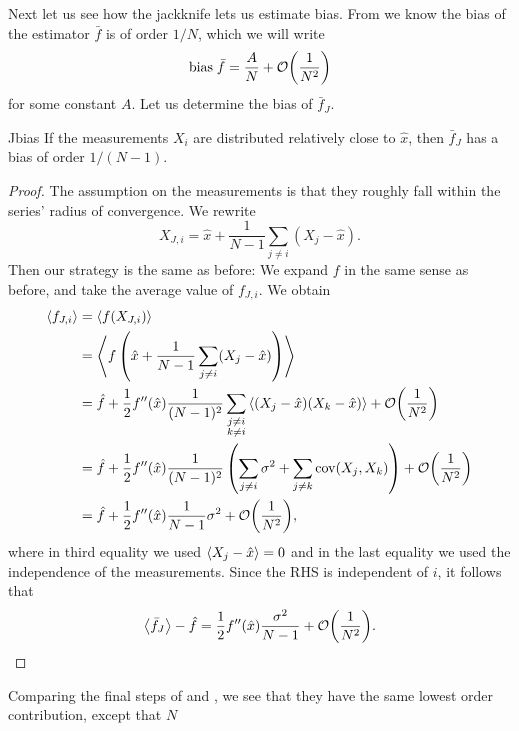 Next let us see how the jackknife lets us estimate bias.
From  we know the bias of the estimator $\bar{f}$ 
is of order $1/N$, which we will write
\begin{equation}\label{eq:bias}
  \text{bias}\;\bar{f}=\frac{A}{N}+\order{\frac{1}{N^2}}
\end{equation}
for some constant $A$. Let us determine the bias of $\bar{f}_J$.
\begin{proposition}{}{Jbias}
  If the measurements $X_i$ are distributed relatively close to $\hat{x}$, 
  then $\bar{f}_J$ has a bias of order $1/(N-1)$.
  \begin{proof}
    The assumption on the measurements is that they roughly fall within
    the series' radius of convergence. We rewrite
    $$
      X_{J,i}=\hat{x}+\frac{1}{N-1}\sum_{j\neq i}(X_j-\hat{x}).
    $$
    Then our strategy is the same as before: We expand $f$ in the same
    sense as before, and take the average value of $f_{J,i}$.
    We obtain
    \begin{equation*}
      \begin{aligned}
        \ev{f_{J,i}}&=\ev{f(X_{J,i})}\\
          &=\ev{f\left(\hat{x}
            +\frac{1}{N-1}\sum_{j\neq i}(X_j-\hat{x})\right)}\\
          &=\hat{f}+\frac{1}{2}f''(\hat{x})\frac{1}{(N-1)^2}
             \sum_{\substack{j\neq i\\k\neq i}}
              \ev{(X_j-\hat{x})(X_k-\hat{x})}
             +\order{\frac{1}{N^2}}\\
          &=\hat{f}+\frac{1}{2}f''(\hat{x})\frac{1}{(N-1)^2}\left(
             \sum_{j\neq i}\sigma^2+\sum_{j\neq k}\Cov(X_j,X_k)\right)
             +\order{\frac{1}{N^2}}\\
          &=\hat{f}+\frac{1}{2}f''(\hat{x})\frac{1}{N-1}\sigma^2
             +\order{\frac{1}{N^2}},
      \end{aligned}
    \end{equation*}
    where in third equality we used $\ev{X_j-\hat{x}}=0$ and in the
    last equality we used the independence of the measurements. Since
    the RHS is independent of $i$, it follows that
    $$
      \ev{\bar{f}_J}-\hat{f}=\frac{1}{2}f''(\hat{x})\frac{\sigma^2}{N-1}
       +\order{\frac{1}{N^2}}.
    $$
  \end{proof}
\end{proposition}
Comparing the final steps of  and ,
we see that they have the same lowest order contribution, except that $N$
